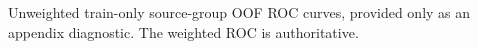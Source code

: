Unweighted train-only source-group OOF ROC curves, provided only as an appendix diagnostic. The weighted ROC is authoritative.
